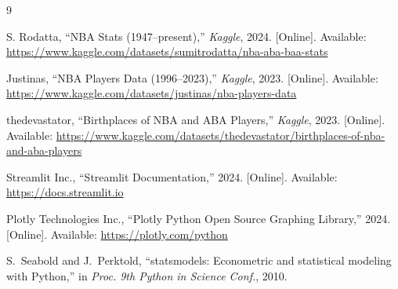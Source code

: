 \documentclass[conference]{IEEEtran}
\begin{document}
\begin{thebibliography}{9}

S. Rodatta, ``NBA Stats (1947--present),''
\textit{Kaggle}, 2024. [Online]. Available:
\url{https://www.kaggle.com/datasets/sumitrodatta/nba-aba-baa-stats}

Justinas, ``NBA Players Data (1996--2023),''
\textit{Kaggle}, 2023. [Online]. Available:
\url{https://www.kaggle.com/datasets/justinas/nba-players-data}

thedevastator, ``Birthplaces of NBA and ABA Players,''
\textit{Kaggle}, 2023. [Online]. Available:
\url{https://www.kaggle.com/datasets/thedevastator/birthplaces-of-nba-and-aba-players}

Streamlit Inc., ``Streamlit Documentation,'' 2024. [Online]. Available:
\url{https://docs.streamlit.io}

Plotly Technologies Inc., ``Plotly Python Open Source Graphing Library,''
2024. [Online]. Available: \url{https://plotly.com/python}

S.~Seabold and J.~Perktold, ``statsmodels: Econometric and statistical
modeling with Python,'' in \textit{Proc. 9th Python in Science Conf.}, 2010.

\end{thebibliography}
\end{document}
